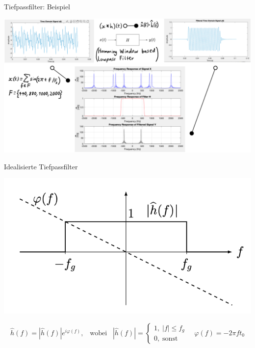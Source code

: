 \documentclass[14pt, aspectratio=169, handout]{beamer}
\begin{document}
\begin{frame}{Tiefpassfilter: Beispiel}
    \vspace*{-0.25cm}
    \begin{center}
        \includegraphics[width=0.98\linewidth]{figures/Hamming_lp.jpg}
    \end{center}
\end{frame}

\begin{frame}{Idealisierte Tiefpassfilter}
\begin{center}
    \includegraphics[width=0.6\linewidth]{figures/h_id_freq.png}
\end{center}
    $$\hat{h}(f) = |\hat{h}(f)|e^{i \varphi(f)}, \hspace{10pt} \text{wobei} \hspace{10pt} |\hat{h}(f)|= \begin{cases}
    1, \; |f| \leq f_g\\
    0, \; \text{sonst}
    \end{cases} \hspace{12pt} \varphi(f) = -2 \pi f t_0$$
\end{frame}
\end{document}
